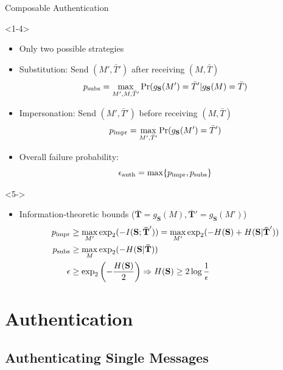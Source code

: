 \documentclass[xcolor=dvipsnames]{beamer}
\newcommand{\?}{\mathrel{?}} %
\newcommand{\rv}[1]{\boldsymbol{\mathbf{#1}}} %
\newcommand{\psubs}{p_{\rm subs}}
\newcommand{\pimpr}{p_{\rm impr}}
\newcommand{\auth}{\rm auth}
\begin{document}
\begin{frame}{Composable Authentication}
  \begin{onlyenv}<1-4>
    \begin{itemize}[<+->]
      \item Only two possible strategies
      \item Substitution: Send \((M',\bar{T}')\) after receiving \((M,\bar{T})\)
        \[ \psubs = \max_{M',M,\bar{T}'} \Pr(g_{\rv{S}}(M') = \bar{T}'|g_{\rv{S}}(M) = \bar{T}) \]
      \item Impersonation: Send \((M',\bar{T}')\) before receiving \((M,\bar{T})\)
        \[ \pimpr = \max_{M',\bar{T}'} \Pr(g_{\rv{S}}(M') = \bar{T}') \]
      \item Overall failure probability:
        \[ \epsilon_{\auth} = \max\{ \pimpr, \psubs \} \]
    \end{itemize}
  \end{onlyenv}
  \begin{onlyenv}<5->
    \begin{itemize}[<+->]
      \item Information-theoretic bounds (\(\rv{\bar{T}} = g_{\rv{S}}(M), \rv{\bar{T}}' = g_{\rv{S}}(M')\))
        \begin{align*}
          \pimpr &\geq \max_{M'} \exp_2(-I(\rv{S};\rv{\bar{T}}')) = \max_{M'} \exp_2(-H(\rv{S})+H(\rv{S}|\rv{\bar{T}}')) \\
          \psubs &\geq \max_{M} \exp_2(-H(\rv{S}|\rv{\bar{T}})) \\
          \epsilon &\geq \exp_2\left( -\frac{H(\rv{S})}{2} \right) \Rightarrow H(\rv{S}) \geq 2 \log \frac{1}{\epsilon}
        \end{align*}
    \end{itemize}
  \end{onlyenv}
\end{frame}

\section{Authentication}

\subsection{Authenticating Single Messages}
\end{document}
